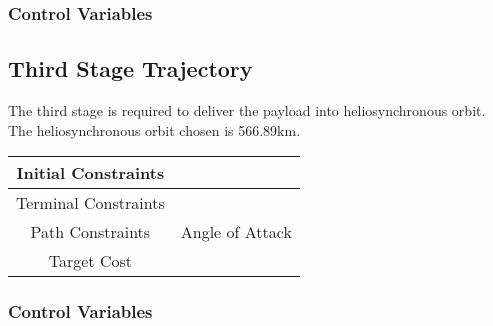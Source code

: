 \subsubsection{Control Variables}


\subsection{Third Stage Trajectory}

The third stage is required to deliver the payload into heliosynchronous orbit. The heliosynchronous orbit chosen is 566.89km. 

\begin{tabular}{|c|c|}
	\hline Initial Constraints  & \\ 
	\hline Terminal Constraints &  \\ 
	\hline Path Constraints & Angle of Attack \\ 
	\hline Target Cost &  \\ 
	\hline 
\end{tabular} 

\subsubsection{Control Variables}

